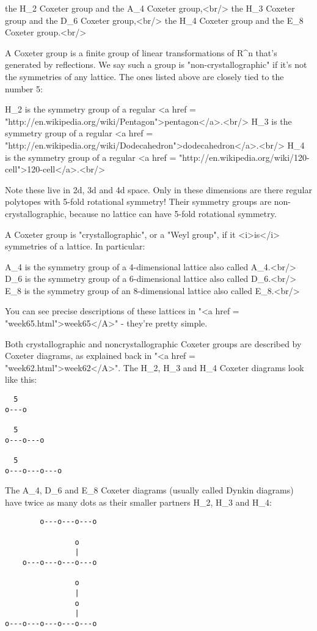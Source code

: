 the H_{2} Coxeter group and the A_{4} Coxeter group,<br/>
the H_{3} Coxeter group and the D_{6} Coxeter group,<br/>
the H_{4} Coxeter group and the E_{8} Coxeter group.<br/>

A Coxeter group is a finite group of linear transformations of 
R^{n} that's generated by reflections.  We say such a group is
"non-crystallographic" if it's not the symmetries of any lattice. 
The ones listed above are closely tied to the number 5:

H_{2} is the symmetry group of a regular 
<a href = "http://en.wikipedia.org/wiki/Pentagon">pentagon</a>.<br/>
H_{3} is the symmetry group of a regular <a href = "http://en.wikipedia.org/wiki/Dodecahedron">dodecahedron</a>.<br/>
H_{4} is the symmetry group of a regular <a href = "http://en.wikipedia.org/wiki/120-cell">120-cell</a>.<br/>

Note these live in 2d, 3d and 4d space.  Only in these dimensions 
are there regular polytopes with 5-fold rotational symmetry!  Their 
symmetry groups are non-crystallographic, because no lattice can 
have 5-fold rotational symmetry.

A Coxeter group is "crystallographic", or a "Weyl
group", if it <i>is</i> symmetries of a lattice.  In particular:

A_{4} is the symmetry group of a 4-dimensional lattice also
called A_{4}.<br/> 
D_{6} is the symmetry group of a 6-dimensional lattice also 
called D_{6}.<br/> 
E_{8} is the symmetry group of an 8-dimensional lattice also 
called
E_{8}.<br/>

You can see precise descriptions of these lattices in "<a href = "week65.html">week65</A>" -
they're pretty simple.

Both crystallographic and noncrystallographic Coxeter groups are 
described by Coxeter diagrams, as explained back in "<a href = "week62.html">week62</A>".  The 
H_{2}, H_{3} and H_{4} Coxeter diagrams look like this:

\begin{verbatim}
  5
o---o

  5
o---o---o

  5
o---o---o---o
\end{verbatim}
    

The A_{4}, D_{6} and E_{8} Coxeter diagrams (usually
called Dynkin diagrams) have twice as many dots as their smaller
partners H_{2}, H_{3} and H_{4}:
 
\begin{verbatim}
        o---o---o---o

                o
                |
    o---o---o---o---o

                o
                |
                o
                | 
o---o---o---o---o---o
\end{verbatim}
    

